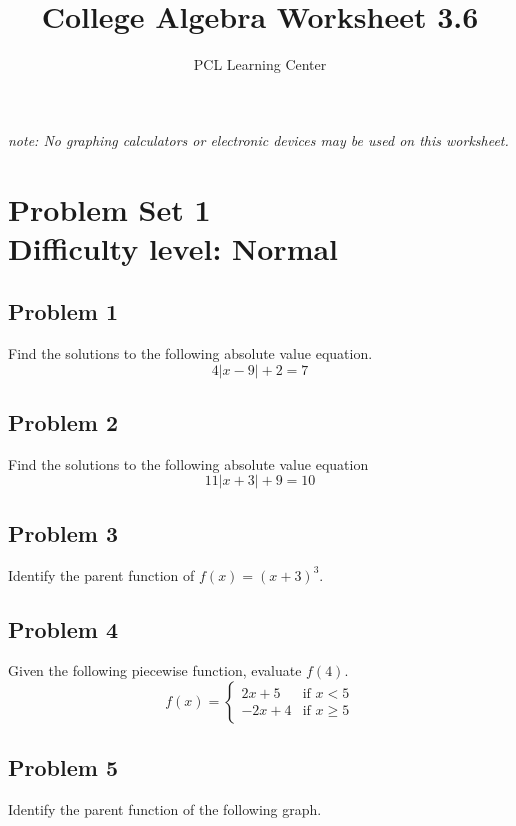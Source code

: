 \documentclass[12pt]{article}
\title{College Algebra Worksheet 3.6}
\author{PCL Learning Center}
\date{}
\begin{document}
\maketitle

\begin{center}
    \textit{note: No graphing calculators or electronic devices may be used on this worksheet.}    
\end{center}

\section*{Problem Set 1\\Difficulty level: Normal}
\subsection*{Problem 1}
Find the solutions to the following absolute value equation.
\[4|x-9|+2=7\]

\subsection*{Problem 2}
Find the solutions to the following absolute value equation
\[11|x+3|+9=10\]

\subsection*{Problem 3}
Identify the parent function of \(f(x)=(x+3)^3\).

\subsection*{Problem 4}
Given the following piecewise function, evaluate \(f(4)\).
\[
f(x) = \begin{cases} 
2x + 5 & \text{if } x < 5 \\ 
-2x + 4 & \text{if } x \geq 5 
\end{cases}
\]

\subsection*{Problem 5}
Identify the parent function of the following graph.

    \begin{center}
    \end{center}
\end{document}
